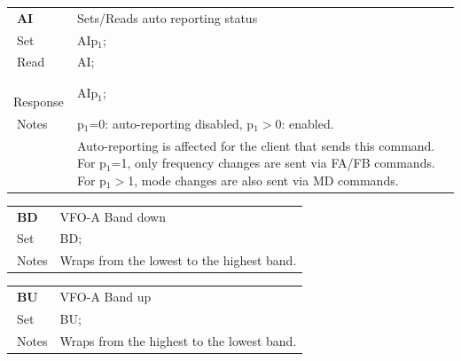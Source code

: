 \documentclass[12pt]{book}
\begin{document}
\begin{center}
\begin{tabular}{|p{2cm}|p{11cm}|}
\toprule
$\phantom{\Big|}$\textbf{\large AI} & Sets/Reads auto reporting status \\\cline{1-2}
$\phantom{\Big|}${\large Set} & {AIp$_1$;} \\\hline
$\phantom{\Big|}${\large Read} & {AI;} \\\hline
$\phantom{\Big|}${\large Response} & {AIp$_1$;} \\\hline
$\phantom{\Big|}${\large Notes} & \multicolumn{1}{|p{11cm}|}{p$_1$=0: auto-reporting disabled, p$_1$$>$0: enabled.} \\
& \multicolumn{1}{|p{11cm}|}{Auto-reporting is affected for the client that sends this command. For p$_1$=1, only frequency changes are sent via FA/FB commands. For p$_1$$>$1, mode changes are also sent via MD commands.} \\
\bottomrule
\end{tabular}
\end{center}

\begin{center}
\begin{tabular}{|p{2cm}|p{11cm}|}
\toprule
$\phantom{\Big|}$\textbf{\large BD} & VFO-A Band down \\\cline{1-2}
$\phantom{\Big|}${\large Set} & {BD;} \\\hline
$\phantom{\Big|}${\large Notes} & \multicolumn{1}{|p{11cm}|}{Wraps from the lowest to the highest band.} \\
\bottomrule
\end{tabular}
\end{center}

\begin{center}
\begin{tabular}{|p{2cm}|p{11cm}|}
\toprule
$\phantom{\Big|}$\textbf{\large BU} & VFO-A Band up \\\cline{1-2}
$\phantom{\Big|}${\large Set} & {BU;} \\\hline
$\phantom{\Big|}${\large Notes} & \multicolumn{1}{|p{11cm}|}{Wraps from the highest to the lowest band.} \\
\bottomrule
\end{tabular}
\end{center}
\end{document}
